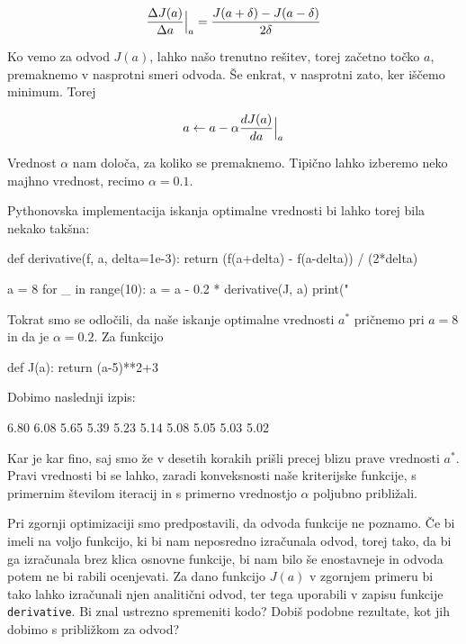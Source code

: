 \begin{equation}
  {\Delta J(a)\over \Delta a}\Bigr|_{a} = {J(a+\delta) - J(a-\delta) \over
    2\delta}
\end{equation}

Ko vemo za odvod $J(a)$, lahko našo trenutno rešitev, torej začetno
točko $a$, premaknemo v nasprotni smeri odvoda. Še enkrat, v nasprotni
zato, ker iščemo minimum. Torej

\begin{equation}
  a \leftarrow a - \alpha {dJ(a)\over da}\Bigr|_{a}
\end{equation}

Vrednost $\alpha$ nam določa, za koliko se premaknemo. Tipično lahko
izberemo neko majhno vrednost, recimo $\alpha=0.1$.

Pythonovska implementacija iskanja optimalne vrednosti bi lahko torej
bila nekako takšna:

\begin{python}
def derivative(f, a, delta=1e-3):
    return (f(a+delta) - f(a-delta)) / (2*delta)

a = 8
for _ in range(10):
    a = a - 0.2 * derivative(J, a)
    print("%
\end{python}

Tokrat smo se odločili, da naše iskanje optimalne vrednosti $a^*$
pričnemo pri $a=8$ in da je $\alpha=0.2$. Za funkcijo

\begin{python}
def J(a):
    return (a-5)**2+3
\end{python}

Dobimo naslednji izpis:

\begin{python}
6.80
6.08
5.65
5.39
5.23
5.14
5.08
5.05
5.03
5.02
\end{python}

Kar je kar fino, saj smo že v desetih korakih prišli precej blizu
prave vrednosti $a^*$. Pravi vrednosti bi se lahko, zaradi
konveksnosti naše kriterijske funkcije, s primernim številom
iteracij in s primerno vrednostjo $\alpha$ poljubno približali.

Pri zgornji optimizaciji smo predpostavili, da odvoda funkcije ne
poznamo. Če bi imeli na voljo funkcijo, ki bi nam neposredno
izračunala odvod, torej tako, da bi ga izračunala brez klica osnovne
funkcije, bi nam bilo še enostavneje in odvoda potem ne bi rabili
ocenjevati. Za dano funkcijo $J(a)$ v zgornjem primeru bi tako lahko
izračunali njen analitični odvod, ter tega uporabili v zapisu funkcije
{\tt derivative}. Bi znal ustrezno spremeniti kodo? Dobiš podobne
rezultate, kot jih dobimo s približkom za odvod?

